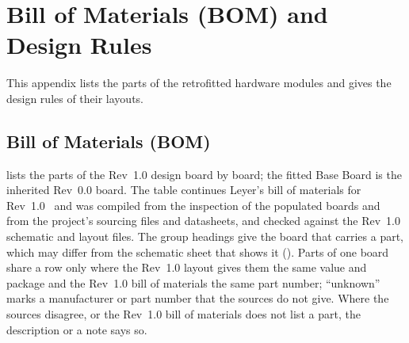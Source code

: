 \chapter{Bill of Materials (BOM) and Design Rules}
\label{app:bom_drc}

This appendix lists the parts of the retrofitted hardware modules and gives the design rules of their layouts.

\section{Bill of Materials (BOM)}
\label{sec:app_bom}

 lists the parts of the Rev~1.0 design board by board; the fitted Base Board is the inherited Rev~0.0 board. The table continues Leyer's bill of materials for Rev~1.0~\cite{leyer2023} and was compiled from the inspection of the populated boards and from the project's sourcing files and datasheets, and checked against the Rev~1.0 schematic and layout files. The group headings give the board that carries a part, which may differ from the schematic sheet that shows it (). Parts of one board share a row only where the Rev~1.0 layout gives them the same value and package and the Rev~1.0 bill of materials the same part number; \enquote{unknown} marks a manufacturer or part number that the sources do not give. Where the sources disagree, or the Rev~1.0 bill of materials does not list a part, the description or a note says so.

